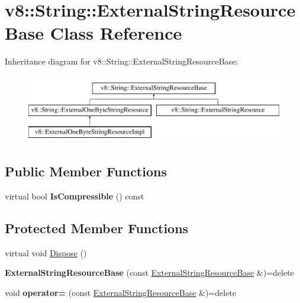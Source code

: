 \hypertarget{classv8_1_1String_1_1ExternalStringResourceBase}{}\section{v8\+:\+:String\+:\+:External\+String\+Resource\+Base Class Reference}
\label{classv8_1_1String_1_1ExternalStringResourceBase}
Inheritance diagram for v8\+:\+:String\+:\+:External\+String\+Resource\+Base\+:\begin{figure}[H]
\begin{center}
\leavevmode
\includegraphics[height=3.000000cm]{classv8_1_1String_1_1ExternalStringResourceBase}
\end{center}
\end{figure}
\subsection*{Public Member Functions}
\begin{DoxyCompactItemize}
\item 
\mbox{\label{classv8_1_1String_1_1ExternalStringResourceBase_aea69648f432efa7114684852d0ccfae6}} 
virtual bool {\bfseries Is\+Compressible} () const
\end{DoxyCompactItemize}
\subsection*{Protected Member Functions}
\begin{DoxyCompactItemize}
\item 
virtual void \mbox{\hyperlink{classv8_1_1String_1_1ExternalStringResourceBase_af4720342ae31e1ab4656df3f15d069c0}{Dispose}} ()
\item 
\mbox{\label{classv8_1_1String_1_1ExternalStringResourceBase_a2e9ebb706e3ebb401b1055a865b0ae0f}} 
{\bfseries External\+String\+Resource\+Base} (const \mbox{\hyperlink{classv8_1_1String_1_1ExternalStringResourceBase}{External\+String\+Resource\+Base}} \&)=delete
\item 
\mbox{\label{classv8_1_1String_1_1ExternalStringResourceBase_a17df23bb8aab9ee8c9658d6ebaf99e8c}} 
void {\bfseries operator=} (const \mbox{\hyperlink{classv8_1_1String_1_1ExternalStringResourceBase}{External\+String\+Resource\+Base}} \&)=delete
\end{DoxyCompactItemize}
